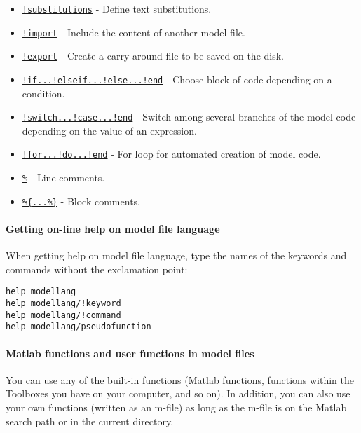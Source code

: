 \begin{itemize}
\itemsep1pt\parskip0pt
\item
  \href{modellang/substitutions}{\texttt{!substitutions}} - Define text
  substitutions.
\item
  \href{modellang/import}{\texttt{!import}} - Include the content of
  another model file.
\item
  \href{modellang/export}{\texttt{!export}} - Create a carry-around file
  to be saved on the disk.
\item
  \href{modellang/if}{\texttt{!if...!elseif...!else...!end}} - Choose
  block of code depending on a condition.
\item
  \href{modellang/switch}{\texttt{!switch...!case...!end}} - Switch
  among several branches of the model code depending on the value of an
  expression.
\item
  \href{modellang/for}{\texttt{!for...!do...!end}} - For loop for
  automated creation of model code.
\item
  \href{modellang/linecomments}{\texttt{\%}} - Line comments.
\item
  \href{modellang/blockcomments}{\texttt{\%\{...\%\}}} - Block comments.
\end{itemize}

\paragraph{Getting on-line help on model file
language}\label{getting-on-line-help-on-model-file-language}

When getting help on model file language, type the names of the keywords
and commands without the exclamation point:

\begin{verbatim}
help modellang
help modellang/!keyword
help modellang/!command 
help modellang/pseudofunction
\end{verbatim}

\paragraph{Matlab functions and user functions in model
files}\label{matlab-functions-and-user-functions-in-model-files}

You can use any of the built-in functions (Matlab functions, functions
within the Toolboxes you have on your computer, and so on). In addition,
you can also use your own functions (written as an m-file) as long as
the m-file is on the Matlab search path or in the current directory.

